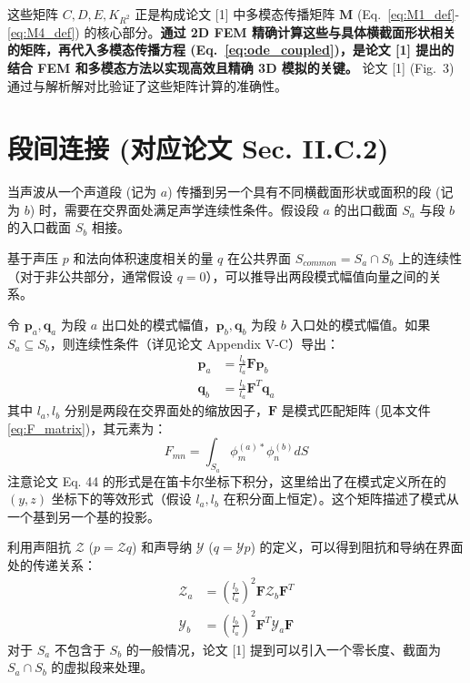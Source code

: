 \documentclass{ctexart}
\begin{document}
这些矩阵 $C, D, E, K_{R^2}$ 正是构成论文 [1] 中多模态传播矩阵 $\mathbf{M}$ (Eq.~\eqref{eq:M1_def}-\eqref{eq:M4_def}) 的核心部分。\textbf{通过 2D FEM 精确计算这些与具体横截面形状相关的矩阵，再代入多模态传播方程 (Eq.~\eqref{eq:ode_coupled})，是论文 [1] 提出的结合 FEM 和多模态方法以实现高效且精确 3D 模拟的关键。} 论文 [1] (Fig.~3) 通过与解析解对比验证了这些矩阵计算的准确性。

\section{段间连接 (对应论文 Sec. II.C.2)}
当声波从一个声道段 (记为 $a$) 传播到另一个具有不同横截面形状或面积的段 (记为 $b$) 时，需要在交界面处满足声学连续性条件。假设段 $a$ 的出口截面 $S_a$ 与段 $b$ 的入口截面 $S_b$ 相接。

基于声压 $p$ 和法向体积速度相关的量 $q$ 在公共界面 $S_{common} = S_a \cap S_b$ 上的连续性（对于非公共部分，通常假设 $q=0$），可以推导出两段模式幅值向量之间的关系。

令 $\mathbf{p}_a, \mathbf{q}_a$ 为段 $a$ 出口处的模式幅值，$\mathbf{p}_b, \mathbf{q}_b$ 为段 $b$ 入口处的模式幅值。如果 $S_a \subseteq S_b$，则连续性条件（详见论文 Appendix V-C）导出：
\begin{align}
\mathbf{p}_a &= \frac{l_b}{l_a} \mathbf{F} \mathbf{p}_b \label{eq:junction_p} \\
\mathbf{q}_b &= \frac{l_b}{l_a} \mathbf{F}^T \mathbf{q}_a \label{eq:junction_q}
\end{align}
其中 $l_a, l_b$ 分别是两段在交界面处的缩放因子，$\mathbf{F}$ 是模式匹配矩阵 (见本文件 \eqref{eq:F_matrix})，其元素为：
\begin{equation} \label{eq:F_matrix}
F_{mn} = \int_{S_a} \phi_m^{(a)*} \phi_n^{(b)} dS
\end{equation}
注意论文 Eq. 44 的形式是在笛卡尔坐标下积分，这里给出了在模式定义所在的 $(y,z)$ 坐标下的等效形式（假设 $l_a, l_b$ 在积分面上恒定）。这个矩阵描述了模式从一个基到另一个基的投影。

利用声阻抗 $\boldsymbol{\mathcal{Z}}$ ($p = \mathcal{Z}q$) 和声导纳 $\boldsymbol{\mathcal{Y}}$ ($q = \mathcal{Y}p$) 的定义，可以得到阻抗和导纳在界面处的传递关系：
\begin{align}
\boldsymbol{\mathcal{Z}}_a &= \left(\frac{l_b}{l_a}\right)^2 \mathbf{F} \boldsymbol{\mathcal{Z}}_b \mathbf{F}^T \label{eq:impedance_junction} \\
\boldsymbol{\mathcal{Y}}_b &= \left(\frac{l_b}{l_a}\right)^2 \mathbf{F}^T \boldsymbol{\mathcal{Y}}_a \mathbf{F} \label{eq:admittance_junction}
\end{align}
对于 $S_a$ 不包含于 $S_b$ 的一般情况，论文 [1] 提到可以引入一个零长度、截面为 $S_a \cap S_b$ 的虚拟段来处理。
\end{document}
